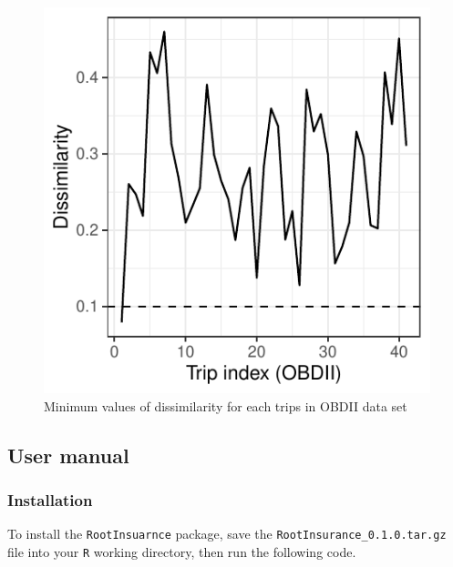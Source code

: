 \documentclass[letterpaper,9pt,twocolumn,twoside,]{pinp}
\begin{document}
\begin{figure}

{\centering \includegraphics{report_issaclee_files/figure-latex/dissimilarity-1} 

}

\caption{Minimum values of dissimilarity for each trips in OBDII data set}\label{fig:dissimilarity}
\end{figure}

\hypertarget{user-manual}{%
\subsection{User manual}\label{user-manual}}

\hypertarget{installation}{%
\subsubsection{Installation}\label{installation}}

To install the \texttt{RootInsuarnce} package, save the
\texttt{RootInsurance\_0.1.0.tar.gz} file into your \texttt{R} working
directory, then run the following code.

\begin{Shaded}
\begin{Highlighting}[]
\NormalTok{(}\NormalTok{,}
                  \NormalTok{, } \NormalTok{)}
\end{Highlighting}
\end{Shaded}
\end{document}
